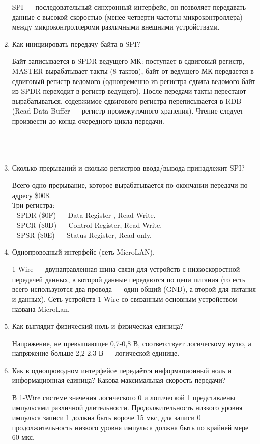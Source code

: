 \documentclass{lab}
\begin{document}
\begin{enumerate}
	SPI — последовательный синхронный интерфейс, он позволяет передавать данные с высокой скоростью (менее четверти частоты микроконтроллера) между микроконтроллероми различными внешними устройствами.
	\item Как инициировать передачу байта в SPI?
	
	
	Байт записывается в SPDR ведущего МК: поступает в сдвиговый регистр, MASTER
	вырабатывает такты (8 тактов), байт от ведущего МК передается в сдвиговый регистр
	ведомого (одновременно из регистра сдвига ведомого байт из SPDR переходит в регистр
	ведущего). После передачи такты перестают вырабатываться, содержимое сдвигового
	регистра переписывается в RDB (Read Data Buffer — регистр промежуточного хранения).
	Чтение следует произвести до конца очередного цикла передачи.\\\\\\\\
	
	\item Сколько прерываний и сколько регистров ввода/вывода принадлежит SPI?
	
	Всего одно прерывание, которое вырабатывается по окончании передачи по адресу \$008. \\
	Три регистра:\\
	- SPDR (\$0F) — Data Register , Read-Write.\\
	- SPCR (\$0D) — Control Register, Read-Write.\\
	- SPSR (\$0E) — Status Register, Read only.
	\item Однопроводный интерфейс (сеть MicroLAN).
	
	
	1-Wire — двунаправленная шина связи для устройств с низкоскоростной передачей
	данных, в которой данные передаются по цепи питания (то есть всего используются два
	провода — один общий (GND), а второй для питания и данных). Сеть устройств 1-Wire
	со связанным основным устройством названа MicroLan.
	\item Как выглядит физический ноль и физическая единица?
	
	Напряжение, не превышающее 0,7-0,8 В, соответствует логическому нулю, а напряжение больше 2,2-2,3 В — логической единице.
	\item Как в однопроводном интерфейсе передаётся информационный ноль и информационная единица? Какова максимальная скорость передачи?
	
	В 1-Wire системе значения логического 0 и логической 1 представлены импульсами
	различной длительности. Продолжительность низкого уровня импульса записи 1 должна
	быть короче 15 мкс, для записи 0 продолжительность низкого уровня импульса должна
	быть по крайней мере 60 мкс.
	

\end{enumerate}
\end{document}
